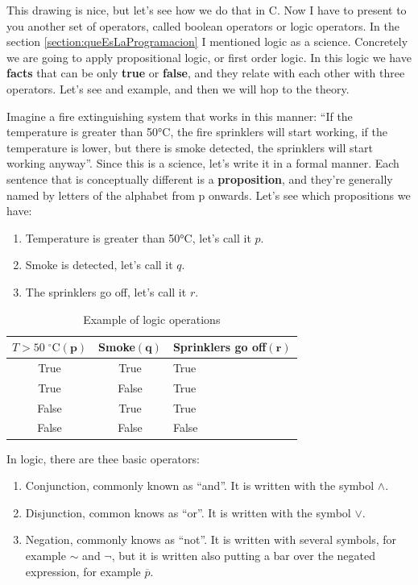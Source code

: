 \documentclass[a4paper]{article}
\newcommand{\centigrade}{°C}
\begin{document}
This drawing is nice, but let's see how we do that in C. Now I have to present
to you another set of operators, called boolean operators or logic operators.
In the section \ref{section:queEsLaProgramacion} I mentioned logic as a science.
Concretely we are going to apply propositional logic, or first order logic.
In this logic we have \textbf{facts} that can be only \textbf{true} or
\textbf{false}, and they relate with each other with three operators. Let's see
and example, and then we will hop to the theory.

Imagine a fire extinguishing system that works in this manner: ``If the
temperature is greater than 50\centigrade, the fire sprinklers will start
working, if the temperature is lower, but there is smoke detected, the sprinklers
will start working anyway''. Since this is a science, let's write it in a formal
manner. Each sentence that is conceptually different is a \textbf{proposition},
and they're generally named by letters of the alphabet from p onwards. Let's
see which propositions we have:

\begin{enumerate}
    \item Temperature is greater than 50\centigrade, let's call it $p$.
    \item Smoke is detected, let's call it $q$.
    \item The sprinklers go off, let's call it $r$.
\end{enumerate}


\begin{table}[H]
\begin{tabularx}{\linewidth}{|c|c|Y|}
\hline
$T>50\;{}^{\circ}\mathrm{C}(\mathbf{p})$&Smoke$(\mathbf{q})$&Sprinklers go off$(\mathbf{r})$\\\hline
True  & True  & True  \\\hline
True  & False & True  \\\hline
False & True  & True  \\\hline
False & False & False \\\hline
\end{tabularx}
\caption{Example of logic operations}
\label{tab:logicOperationExample}%
\end{table}

In logic, there are thee basic operators:
\begin{enumerate}
\item Conjunction, commonly known as ``and''. It is written with the symbol $\land$.
\item Disjunction, common knows as ``or''. It is written with the symbol $\lor$.
\item Negation, commonly knows as ``not''. It is written with several symbols,
for example $\sim$ and $\lnot$, but it is written also putting a bar over the
negated expression, for example $\overline{p}$.
\end{enumerate}
\end{document}
